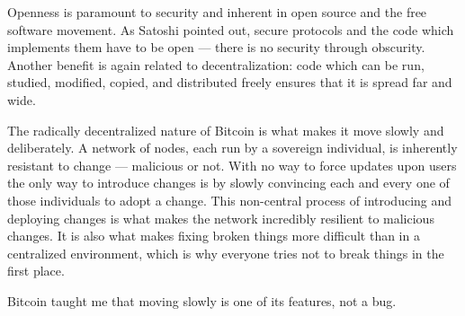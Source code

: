 Openness is paramount to security and inherent in open source and the
free software movement. As Satoshi pointed out, secure protocols and the
code which implements them have to be open --- there is no security
through obscurity. Another benefit is again related to decentralization:
code which can be run, studied, modified, copied, and distributed freely
ensures that it is spread far and wide.

The radically decentralized nature of Bitcoin is what makes it move
slowly and deliberately. A network of nodes, each run by a sovereign
individual, is inherently resistant to change --- malicious or not. With
no way to force updates upon users the only way to introduce changes is
by slowly convincing each and every one of those individuals to adopt a
change. This non-central process of introducing and deploying changes is
what makes the network incredibly resilient to malicious changes. It is
also what makes fixing broken things more difficult than in a
centralized environment, which is why everyone tries not to break things
in the first place.

Bitcoin taught me that moving slowly is one of its features, not a bug.

%
%
%
%
%
%
%
